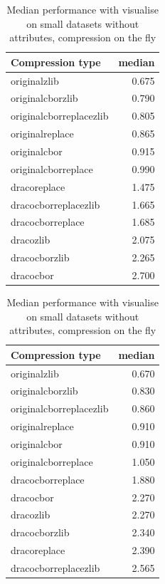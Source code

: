 \begin{table}[!h]
    \begin{minipage}{.5\linewidth}
      \caption{
Median performance with visualise on small datasets, compression on the fly}
\centering

\begin{tabular}{|l|r|}
\hline
Compression type & median\\
\hline
originalzlib & 0.675\\
\hline
originalcborzlib & 0.790\\
\hline
originalcborreplacezlib & 0.805\\
\hline
originalreplace & 0.865\\
\hline
originalcbor & 0.915\\
\hline
originalcborreplace & 0.990\\
\hline
dracoreplace & 1.475\\
\hline
dracocborreplacezlib & 1.665\\
\hline
dracocborreplace & 1.685\\
\hline
dracozlib & 2.075\\
\hline
dracocborzlib & 2.265\\
\hline
dracocbor & 2.700\\
\hline
\end{tabular}
\end{minipage}%
    \begin{minipage}{.5\linewidth}
      \centering
        \caption{
Median performance with visualise on small datasets without attributes, compression on the fly}

\begin{tabular}{|l|r|}
\hline
Compression type & median\\
\hline
originalzlib & 0.670\\
\hline
originalcborzlib & 0.830\\
\hline
originalcborreplacezlib & 0.860\\
\hline
originalreplace & 0.910\\
\hline
originalcbor & 0.910\\
\hline
originalcborreplace & 1.050\\
\hline
dracocborreplace & 1.880\\
\hline
dracocbor & 2.270\\
\hline
dracozlib & 2.270\\
\hline
dracocborzlib & 2.340\\
\hline
dracoreplace & 2.390\\
\hline
dracocborreplacezlib & 2.565\\
\hline
\end{tabular}
\end{minipage} 
\end{table}




